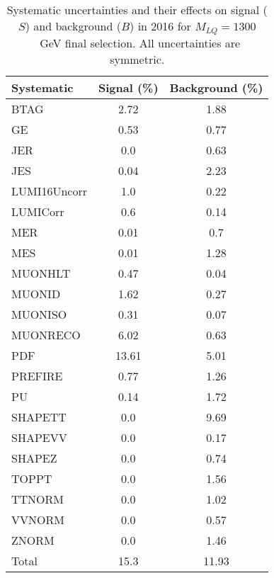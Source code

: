 \begin{table}[htbp]
\begin{center}
\caption{Systematic uncertainties and their effects on signal ($S$) and background ($B$) in 2016 for $M_{LQ}=1300$~GeV final selection. All uncertainties are symmetric.}
\begin{tabular}{lcc}
\hline\hline
Systematic & Signal (\%) & Background (\%) \\ \hline 
BTAG & 2.72 & 1.88\\ 
GE & 0.53 & 0.77\\ 
JER & 0.0 & 0.63\\ 
JES & 0.04 & 2.23\\ 
LUMI16Uncorr & 1.0 & 0.22\\ 
LUMICorr & 0.6 & 0.14\\ 
MER & 0.01 & 0.7\\ 
MES & 0.01 & 1.28\\ 
MUONHLT & 0.47 & 0.04\\ 
MUONID & 1.62 & 0.27\\ 
MUONISO & 0.31 & 0.07\\ 
MUONRECO & 6.02 & 0.63\\ 
PDF & 13.61 & 5.01\\ 
PREFIRE & 0.77 & 1.26\\ 
PU & 0.14 & 1.72\\ 
SHAPETT & 0.0 & 9.69\\ 
SHAPEVV & 0.0 & 0.17\\ 
SHAPEZ & 0.0 & 0.74\\ 
TOPPT & 0.0 & 1.56\\ 
TTNORM & 0.0 & 1.02\\ 
VVNORM & 0.0 & 0.57\\ 
ZNORM & 0.0 & 1.46\\ 
Total & 15.3 & 11.93\\ \hline \hline
\end{tabular}
\label{tab:SysUncertainties_uujj_1300}
\end{center}
\end{table}

